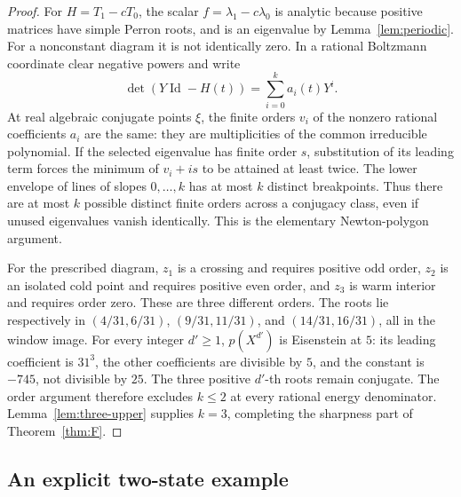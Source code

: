\begin{proof}
For \(H=T_1-cT_0\), the scalar \(f=\lambda_1-c\lambda_0\) is analytic because positive matrices have simple Perron roots, and is an eigenvalue by Lemma~\ref{lem:periodic}. For a nonconstant diagram it is not identically zero. In a rational Boltzmann coordinate clear negative powers and write
\[
\det(Y\operatorname{Id}-H(t))=\sum_{i=0}^k a_i(t)Y^i.
\]
At real algebraic conjugate points \(\xi\), the finite orders \(v_i\) of the nonzero rational coefficients \(a_i\) are the same: they are multiplicities of the common irreducible polynomial. If the selected eigenvalue has finite order \(s\), substitution of its leading term forces the minimum of \(v_i+is\) to be attained at least twice. The lower envelope of lines of slopes \(0,\ldots,k\) has at most \(k\) distinct breakpoints. Thus there are at most \(k\) possible distinct finite orders across a conjugacy class, even if unused eigenvalues vanish identically. This is the elementary Newton-polygon argument.

For the prescribed diagram, \(z_1\) is a crossing and requires positive odd order, \(z_2\) is an isolated cold point and requires positive even order, and \(z_3\) is warm interior and requires order zero. These are three different orders. The roots lie respectively in \((4/31,6/31)\), \((9/31,11/31)\), and \((14/31,16/31)\), all in the window image. For every integer \(d'\ge1\), \(p(X^{d'})\) is Eisenstein at \(5\): its leading coefficient is \(31^3\), the other coefficients are divisible by \(5\), and the constant is \(-745\), not divisible by \(25\). The three positive \(d'\)-th roots remain conjugate. The order argument therefore excludes \(k\le2\) at every rational energy denominator. Lemma~\ref{lem:three-upper} supplies \(k=3\), completing the sharpness part of Theorem~\ref{thm:F}.
\end{proof}

\subsection{An explicit two-state example}

